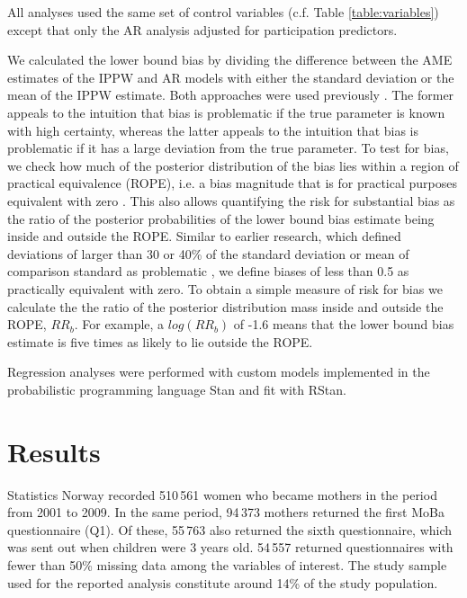 \documentclass[12pt]{article}
\begin{document}
All analyses used the same set of control variables (c.f. Table \ref{table:variables}) except that only the AR analysis adjusted for participation predictors.

We calculated the lower bound bias by dividing the difference between the AME estimates of the IPPW and AR models with either the standard deviation or the mean of the IPPW estimate. Both approaches were used previously \cite{Stuart2010-cj,Nilsen2009-ci}. The former appeals to the intuition that bias is problematic if the true parameter is known with high certainty, whereas the latter appeals to the intuition that bias is problematic if it has a large deviation from the true parameter. To test for bias, we check how much of the posterior distribution of the bias lies within a region of practical equivalence (ROPE), i.e. a bias magnitude that is for practical purposes equivalent with zero \cite{Kruschke2010-zi, Mascha2011-um}. This also allows quantifying the risk for substantial bias as the ratio of the posterior probabilities of the lower bound bias estimate being inside and outside the ROPE. Similar to earlier research, which defined deviations of larger than 30 or 40\% of the standard deviation or mean of comparison standard as problematic \cite{Stuart2010-cj,Nohr2006-uf}, we define biases of less than 0.5 as practically equivalent with zero. To obtain a simple measure of risk for bias we calculate the the ratio of the posterior distribution mass inside and outside the ROPE, $RR_b$. For example, a $log(RR_b)$ of -1.6 means that the lower bound bias estimate is five times as likely to lie outside the ROPE.

Regression analyses were performed with custom models implemented in the probabilistic programming language Stan \cite{Stan_Development_Team2017-lp} and fit with RStan\cite{Stan_Development_Team2017-lp}.

\section{Results}

Statistics Norway recorded 510\,561 women who became mothers in the period from 2001 to 2009. In the same period, 94\,373 mothers returned the first MoBa questionnaire (Q1). Of these, 55\,763 also returned the sixth questionnaire,  which was sent out when  children were 3 years old. 54\,557 returned questionnaires with fewer than 50\% missing data among the variables of interest. The study sample used for the reported analysis constitute around 14\% of the study population.
\end{document}
